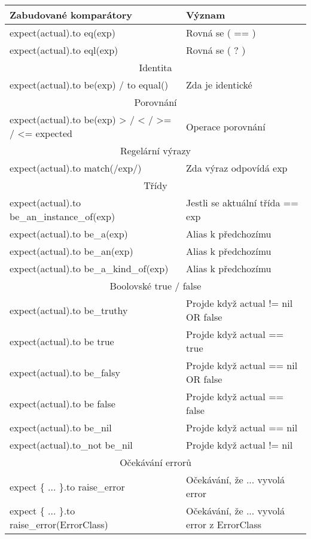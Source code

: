 \begin{longtable}{| p{} | p{} |} 
 \textbf{Zabudované komparátory} & \textbf{Význam} \\ 
 \hline\hline
 expect(actual).to eq(exp) & Rovná se ( == ) \\
 \hline
 expect(actual).to eql(exp) & Rovná se ( ? ) \\
 \hline\hline
 \multicolumn{2}{||c||}{Identita}\\
 \hline
 expect(actual).to be(exp) / to equal() & Zda je identické\\
 \hline\hline
 \multicolumn{2}{||c||}{Porovnání}\\
 \hline
 expect(actual).to be(exp) > / < / >= / <= expected & Operace porovnání \\
 \hline\hline
 \multicolumn{2}{||c||}{Regelární výrazy}\\
 \hline
 expect(actual).to match(/exp/) & Zda výraz odpovídá exp \\
 \hline\hline
 \multicolumn{2}{||c||}{Třídy}\\
 \hline\hline
 expect(actual).to be\_an\_instance\_of(exp) & Jestli se aktuální třída == exp \\
 \hline
 expect(actual).to be\_a(exp) & Alias k předchozímu \\
 \hline
 expect(actual).to be\_an(exp) & Alias k předchozímu  \\
 \hline
 expect(actual).to be\_a\_kind\_of(exp) & Alias k předchozímu  \\
 \hline
 \multicolumn{2}{||c||}{Boolovské true / false}\\
 \hline\hline
 expect(actual).to be\_truthy  & Projde když actual != nil OR false\\
 \hline
 expect(actual).to be true    & Projde když actual == true \\
 \hline
 expect(actual).to be\_falsy   & Projde když actual == nil OR false \\
 \hline
 expect(actual).to be false   & Projde když actual == false \\
 \hline
 expect(actual).to be\_nil     & Projde když actual == nil \\
 \hline
 expect(actual).to\_not be\_nil & Projde když actual != nil \\
 \hline
 \multicolumn{2}{||c||}{Očekávání errorů}\\
 \hline\hline
 expect \{ ... \}.to raise\_error & Očekávání, že ... vyvolá error \\
 \hline
 expect \{ ... \}.to raise\_error(ErrorClass) & Očekávání, že ... vyvolá error z ErrorClass\\

\end{longtable}
